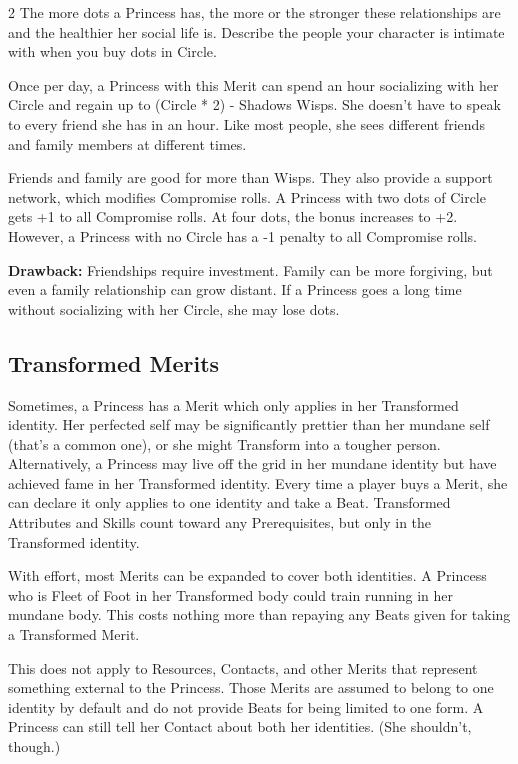 \begin{multicols}{2}
The more dots a Princess has, the more or the stronger these relationships are and the healthier her social life is. Describe the people your character is intimate with when you buy dots in Circle.

Once per day, a Princess with this Merit can spend an hour socializing with her Circle and regain up to (Circle * 2) - Shadows Wisps. She doesn’t have to speak to every friend she has in an hour. Like most people, she sees different friends and family members at different times. 

Friends and family are good for more than Wisps. They also provide a support network, which modifies Compromise rolls. A Princess with two dots of Circle gets +1 to all Compromise rolls. At four dots, the bonus increases to +2. However, a Princess with no Circle has a -1 penalty to all Compromise rolls.

\textbf{Drawback:} Friendships require investment. Family can be more forgiving, but even a family relationship can grow distant. If a Princess goes a long time without socializing with her Circle, she may lose dots. 

\begin{mybox}     

\subsection*{Transformed Merits}

Sometimes, a Princess has a Merit which only applies in her Transformed identity. Her perfected self may be significantly prettier than her mundane self (that's a common one), or she might Transform into a tougher person. Alternatively, a Princess may live off the grid in her mundane identity but have achieved fame in her Transformed identity. Every time a player buys a Merit, she can declare it only applies to one identity and take a Beat. Transformed Attributes and Skills count toward any Prerequisites, but only in the Transformed identity. 

With effort, most Merits can be expanded to cover both identities. A Princess who is Fleet of Foot in her Transformed body could train running in her mundane body. This costs nothing more than repaying any Beats given for taking a Transformed Merit. 

This does not apply to Resources, Contacts, and other Merits that represent something external to the Princess. Those Merits are assumed to belong to one identity by default and do not provide Beats for being limited to one form. A Princess can still tell her Contact about both her identities. (She shouldn't, though.)


\end{mybox}
\end{multicols}
